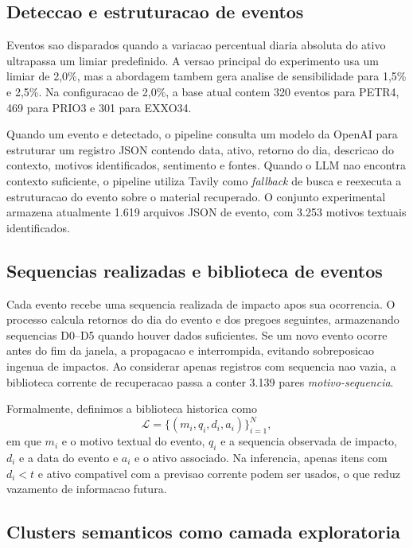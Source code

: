 \documentclass[12pt]{article}
\begin{document}
\subsection{Deteccao e estruturacao de eventos}

Eventos sao disparados quando a variacao percentual diaria absoluta do ativo ultrapassa um limiar predefinido. A versao principal do experimento usa um limiar de 2,0\%, mas a abordagem tambem gera analise de sensibilidade para 1,5\% e 2,5\%. Na configuracao de 2,0\%, a base atual contem 320 eventos para PETR4, 469 para PRIO3 e 301 para EXXO34.

Quando um evento e detectado, o pipeline consulta um modelo da OpenAI para estruturar um registro JSON contendo data, ativo, retorno do dia, descricao do contexto, motivos identificados, sentimento e fontes. Quando o LLM nao encontra contexto suficiente, o pipeline utiliza Tavily como \textit{fallback} de busca e reexecuta a estruturacao do evento sobre o material recuperado. O conjunto experimental armazena atualmente 1.619 arquivos JSON de evento, com 3.253 motivos textuais identificados.

\subsection{Sequencias realizadas e biblioteca de eventos}

Cada evento recebe uma sequencia realizada de impacto apos sua ocorrencia. O processo calcula retornos do dia do evento e dos pregoes seguintes, armazenando sequencias D0--D5 quando houver dados suficientes. Se um novo evento ocorre antes do fim da janela, a propagacao e interrompida, evitando sobreposicao ingenua de impactos. Ao considerar apenas registros com sequencia nao vazia, a biblioteca corrente de recuperacao passa a conter 3.139 pares \textit{motivo-sequencia}.

Formalmente, definimos a biblioteca historica como
\[
\mathcal{L} = \{(m_i, q_i, d_i, a_i)\}_{i=1}^{N},
\]
em que $m_i$ e o motivo textual do evento, $q_i$ e a sequencia observada de impacto, $d_i$ e a data do evento e $a_i$ e o ativo associado. Na inferencia, apenas itens com $d_i < t$ e ativo compativel com a previsao corrente podem ser usados, o que reduz vazamento de informacao futura.

\subsection{Clusters semanticos como camada exploratoria}
\end{document}
